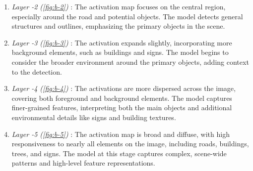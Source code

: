 \begin{enumerate}
    \item \textit{Layer -2 (\ref{fig:b-2})} : The activation map focuses on the central region, especially around the road and potential objects. The model detects general structures and outlines, emphasizing the primary objects in the scene.
    \item \textit{Layer -3 (\ref{fig:b-3})} : The activation expands slightly, incorporating more background elements, such as buildings and signs. The model begins to consider the broader environment around the primary objects, adding context to the detection.
    \item \textit{Layer -4 (\ref{fig:b-4})} : The activations are more dispersed across the image, covering both foreground and background elements. The model captures finer-grained features, interpreting both the main objects and additional environmental details like signs and building textures.
    \item \textit{Layer -5 (\ref{fig:b-5})} : The activation map is broad and diffuse, with high responsiveness to nearly all elements on the image, including roads, buildings, trees, and signs. The model at this stage captures complex, scene-wide patterns and high-level feature representations.
\end{enumerate}




